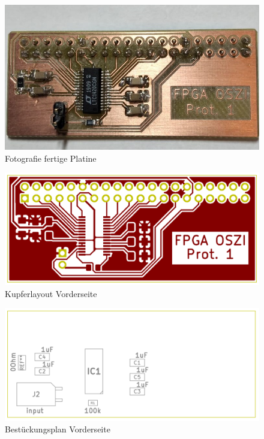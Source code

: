 \begin{figure}[h!]
\begin{center}
\includegraphics[width = 15cm]{SAUER/Grafiken/Prot1/Foto.jpeg}
\caption{Fotografie fertige Platine}
\end{center}
\end{figure}
\begin{figure}[h!]
\begin{center}
\includegraphics[width = 15cm]{SAUER/Grafiken/Prot1/FCU.png}
\caption{Kupferlayout Vorderseite}
\end{center}
\end{figure}
\begin{figure}[h!]
\begin{center}
\includegraphics[width = 15cm]{SAUER/Grafiken/Prot1/FFAB.png}
\caption{Bestückungsplan Vorderseite}
\end{center}
\end{figure}
